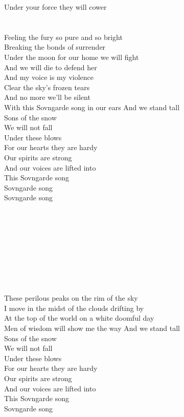 Under your force they will cower \\
\tab{}\tab{}\\
\tab{}\tab{}\\
Feeling the fury so pure and so bright \\
Breaking the bonds of surrender \\
Under the moon for our home we will fight \\
And we will die to defend her \tab{}\\
\hops
{} And my voice is my violence\\
 Clear the sky's frozen tears\\
 And no more we'll be silent\\
 With this Sovngarde song in our ears
\hop
{} {} And we stand tall\\
 {} Sons of the snow\\
 {} We will not fall\\
 {} Under these blows\\
 {} For our hearts they are hardy\\
 {} Our spirits are strong\\
 {} And our voices are lifted into\\
 {} This Sovngarde song \\
 {} Sovngarde song \tab{}\\
 {} Sovngarde song \tab{}\\
\tab{}\tab{}\\
\tab{}\tab{}\\
\tab{}\tab{}\\
\tab{}\tab{}\\
\tab{}\tab{}\\
\tab{}\tab{}\\
\tab{}\tab{}\\
\tab{}\tab{}\\
\tab{}\tab{}\\
These perilous peaks on the rim of the sky \\
I move in the midst of the clouds drifting by\\
At the top of the world on a white doomful day\\ 
Men of wisdom will show me the way
\hops
{} {} And we stand tall\\
 {} Sons of the snow\\
 {} We will not fall\\
 {} Under these blows\\
 {} For our hearts they are hardy\\
 {} Our spirits are strong\\
 {} And our voices are lifted into\\
 {} This Sovngarde song \\
 {} Sovngarde song \tab{}\\
\tab{}\tab{}\\
\tab{}\tab{}
